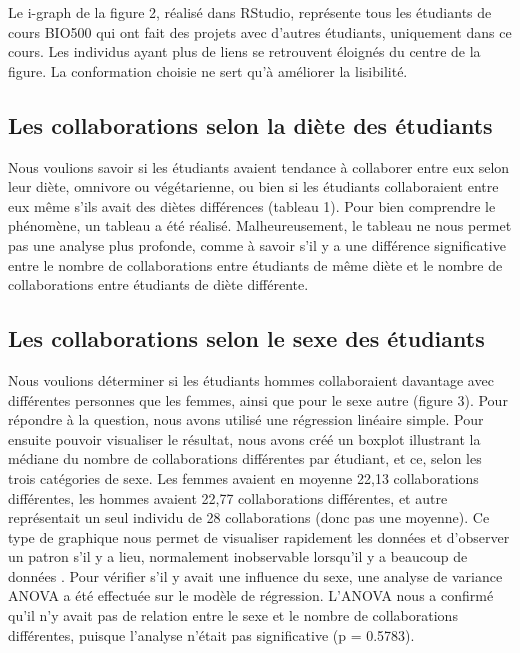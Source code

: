 \documentclass[twoside,twocolumn]{article}
\begin{document}
Le i-graph de la figure 2, réalisé dans RStudio, représente tous les étudiants de cours BIO500 qui ont fait des projets avec d'autres étudiants, uniquement dans ce cours. Les individus ayant plus de liens se retrouvent éloignés du centre de la figure. La conformation choisie ne sert qu'à améliorer la lisibilité.


\subsection{Les collaborations selon la diète des étudiants}

Nous voulions savoir si les étudiants avaient tendance à collaborer entre eux selon leur diète, omnivore ou végétarienne, ou bien si les étudiants collaboraient entre eux même s'ils avait des diètes différences (tableau 1). Pour bien comprendre le phénomène, un tableau a été réalisé. Malheureusement, le tableau ne nous permet pas une analyse plus profonde, comme à savoir s'il y a une différence significative entre le nombre de collaborations entre étudiants de même diète et le nombre de collaborations entre étudiants de diète différente.


\subsection{Les collaborations selon le sexe des étudiants}

Nous voulions déterminer si les étudiants hommes collaboraient davantage avec différentes personnes que les femmes, ainsi que pour le sexe autre (figure 3). Pour répondre à la question, nous avons utilisé une régression linéaire simple. Pour ensuite pouvoir visualiser le résultat, nous avons créé un boxplot illustrant la médiane du nombre de collaborations différentes par étudiant, et ce, selon les trois catégories de sexe. Les femmes avaient en moyenne 22,13 collaborations différentes, les hommes avaient 22,77 collaborations différentes, et autre représentait un seul individu de 28 collaborations (donc pas une moyenne). Ce type de graphique nous permet de visualiser rapidement les données et d'observer un patron s'il y a lieu, normalement inobservable lorsqu'il y a beaucoup de données  \citep{williamson1989box}. Pour vérifier s'il y avait une influence du sexe, une analyse de variance ANOVA a été effectuée sur le modèle de régression. L'ANOVA nous a confirmé qu'il n'y avait pas de relation entre le sexe et le nombre de collaborations différentes, puisque l'analyse n'était pas significative (p = 0.5783).
\end{document}
